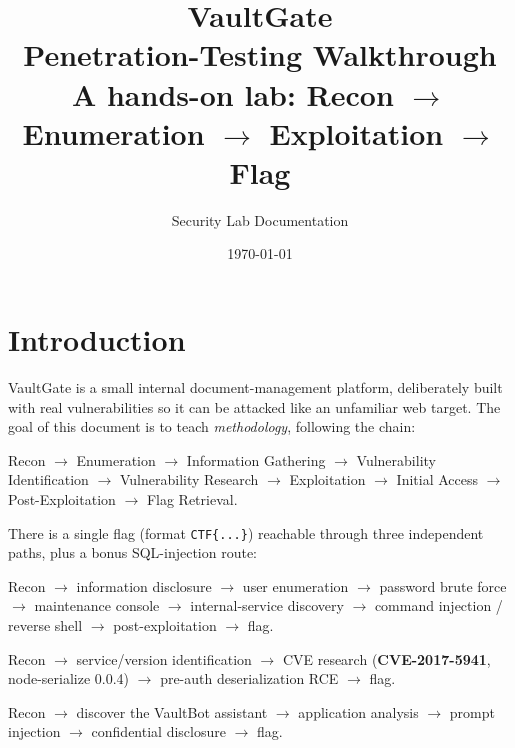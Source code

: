 \documentclass[11pt,a4paper]{article}
\title{\vspace{-1cm}\textbf{\Huge VaultGate}\\[6pt]
\Large Penetration-Testing Walkthrough\\[4pt]
\normalsize A hands-on lab: Recon $\rightarrow$ Enumeration $\rightarrow$ Exploitation $\rightarrow$ Flag}
\author{Security Lab Documentation}
\date{\today}
\begin{document}
\maketitle
\thispagestyle{empty}

\begin{center}
\end{center}

\newpage
\tableofcontents
\newpage

\section{Introduction}
VaultGate is a small internal document-management platform, deliberately built
with real vulnerabilities so it can be attacked like an unfamiliar web target.
The goal of this document is to teach \emph{methodology}, following the chain:

\begin{center}
Recon $\rightarrow$ Enumeration $\rightarrow$ Information Gathering $\rightarrow$
Vulnerability Identification $\rightarrow$ Vulnerability Research $\rightarrow$
Exploitation $\rightarrow$ Initial Access $\rightarrow$ Post-Exploitation $\rightarrow$
Flag Retrieval.
\end{center}

There is a single flag (format \texttt{CTF\{...\}}) reachable through three
independent paths, plus a bonus SQL-injection route:

\begin{description}[leftmargin=1.4cm,style=nextline]
  \item[Path 1] Recon $\rightarrow$ information disclosure $\rightarrow$ user
  enumeration $\rightarrow$ password brute force $\rightarrow$ maintenance console
  $\rightarrow$ internal-service discovery $\rightarrow$ command injection /
  reverse shell $\rightarrow$ post-exploitation $\rightarrow$ flag.
  \item[Path 2] Recon $\rightarrow$ service/version identification $\rightarrow$
  CVE research (\textbf{CVE-2017-5941}, node-serialize 0.0.4) $\rightarrow$
  pre-auth deserialization RCE $\rightarrow$ flag.
  \item[Path 3] Recon $\rightarrow$ discover the VaultBot assistant $\rightarrow$
  application analysis $\rightarrow$ prompt injection $\rightarrow$ confidential
  disclosure $\rightarrow$ flag.
\end{description}
\end{document}
